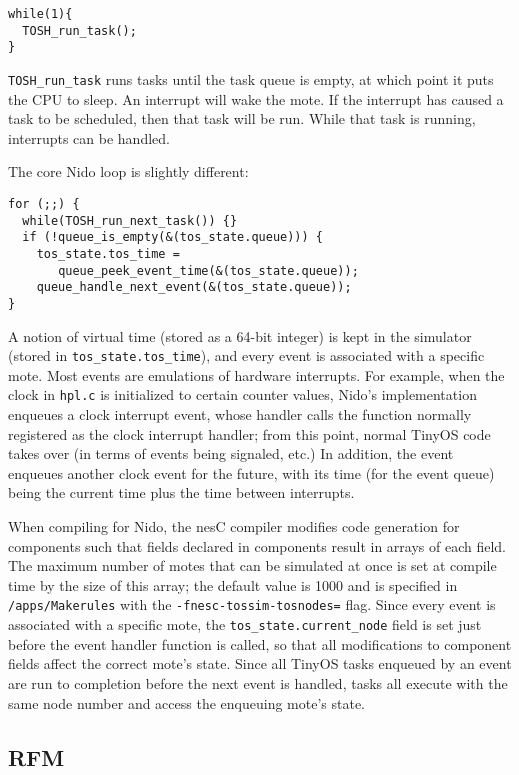 \documentclass[10pt]{article}
\begin{document}
\begin{verbatim}
while(1){
  TOSH_run_task();
}
\end{verbatim}

{\tt TOSH\_run\_task} runs tasks until the task queue is empty, at which
point it puts the CPU to sleep. An interrupt will wake the mote. If
the interrupt has caused a task to be scheduled, then that task will
be run. While that task is running, interrupts can be handled.

The core Nido loop is slightly different:

\begin{verbatim}
for (;;) {
  while(TOSH_run_next_task()) {}
  if (!queue_is_empty(&(tos_state.queue))) {	
    tos_state.tos_time =
       queue_peek_event_time(&(tos_state.queue));
    queue_handle_next_event(&(tos_state.queue));
}
\end{verbatim}



A notion of virtual time (stored as a 64-bit integer) is kept in the
simulator (stored in {\tt tos\_state.tos\_time}), and every event is
associated with a specific mote. Most events are emulations of
hardware interrupts. For example, when the clock in {\tt hpl.c} is
initialized to certain counter values, Nido's implementation
enqueues a clock interrupt event, whose handler calls the function
normally registered as the clock interrupt handler; from this point,
normal TinyOS code takes over (in terms of events being signaled,
etc.) In addition, the event enqueues another clock event for the
future, with its time (for the event queue) being the current time
plus the time between interrupts.

 
When compiling for Nido, the nesC compiler modifies code generation
for components such that fields declared in components result in
arrays of each field.  The maximum number of motes that can be
simulated at once is set at compile time by the size of this array;
the default value is 1000 and is specified in {\tt /apps/Makerules}
with the {\tt -fnesc-tossim-tosnodes=} flag. Since every event is
associated with a specific mote, the {\tt tos\_state.current\_node}
field is set just before the event handler function is called, so that
all modifications to component fields affect the correct mote's
state. Since all TinyOS tasks enqueued by an event are run to
completion before the next event is handled, tasks all execute with
the same node number and access the enqueuing mote's state.

\subsection*{RFM}
\end{document}
